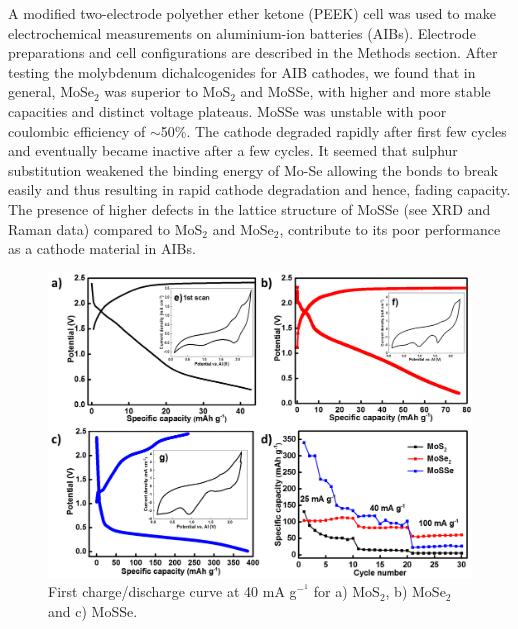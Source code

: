\documentclass[num-refs]{wiley-article}
\begin{document}
A modified two-electrode polyether ether ketone (PEEK) cell was used to make electrochemical measurements on aluminium-ion batteries (AIBs). Electrode preparations and cell configurations are described in the Methods section. After testing the molybdenum dichalcogenides for AIB cathodes, we found that in general, MoSe$_2$ was superior to MoS$_2$ and MoSSe, with higher and more stable capacities and distinct voltage plateaus. MoSSe was unstable with poor coulombic efficiency of $\sim$50\%. The cathode degraded rapidly after first few cycles and eventually became inactive after a few cycles. It seemed that sulphur substitution weakened the binding energy of Mo-Se allowing the bonds to break easily and thus resulting in rapid cathode degradation and hence, fading capacity. The presence of higher defects in the lattice structure of MoSSe (see XRD and Raman data) compared to MoS$_2$ and MoSe$_2$, contribute to its poor performance as a cathode material in AIBs.

\begin{figure}[h!]
\centering
\includegraphics[width=\textwidth]{figures/fig1}
\caption{First charge/discharge curve at 40 mA g$^-^1$ for a) MoS$_2$, b) MoSe$_2$ and c) MoSSe.}
\end{figure}
\end{document}
